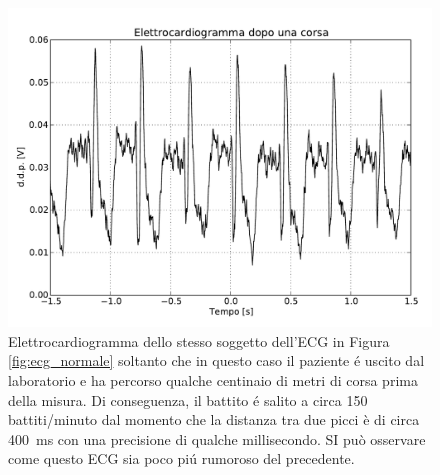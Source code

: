 \begin{figure}
    \includegraphics[height=0.4\textheight]{figure/ecg_corsa.pdf}
    \caption{Elettrocardiogramma dello stesso soggetto dell'ECG in Figura \ref{fig:ecg_normale} soltanto che in questo caso il paziente é uscito dal laboratorio e ha percorso qualche centinaio di metri di corsa prima della misura. Di conseguenza, il battito é salito a circa 150 battiti/minuto dal momento che la distanza tra due picci è di circa \SI{400}{\milli\second} con una precisione di qualche millisecondo. SI può osservare come questo ECG sia poco piú rumoroso del precedente.}
    \label{fig:ecg_corsa}
\end{figure}


